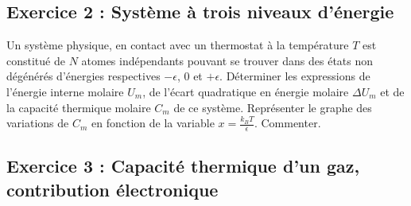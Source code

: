 \subsection{Exercice 2 : Système à trois niveaux d'énergie}

Un système physique, en contact avec un thermostat à la température $T$ est constitué de $N$ atomes indépendants pouvant se trouver dans des états non dégénérés d'énergies respectives $-\epsilon$, $0$ et $+\epsilon$. Déterminer les expressions de l'énergie interne molaire $U_m$, de l'écart quadratique en énergie molaire $\Delta U_m$ et de la capacité thermique molaire $C_m$ de ce système. Représenter le graphe des variations de $C_m$ en fonction de la variable $x = \frac{k_B T}{\epsilon}$. Commenter.

\subsection{Exercice 3 : Capacité thermique d'un gaz, contribution électronique}

